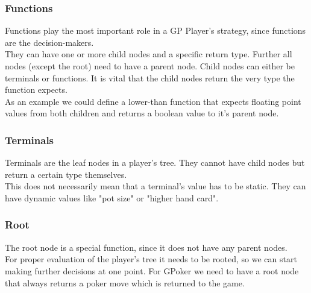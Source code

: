 \documentclass[12pt,fleqn,a4paper]{article}
\begin{document}
\subsubsection{Functions}
Functions play the most important role in a GP Player's strategy, since functions are the decision-makers.\\
They can have one or more child nodes and a specific return type. Further all nodes (except the root)  need to have a parent node.
Child nodes can either be terminals or functions. It is vital that the child nodes return the very type the function expects.\\
As an example we could define a lower-than function that expects floating point values from both children and returns a boolean value to it's parent node.

\subsubsection{Terminals}
Terminals are the leaf nodes in a player's tree. They cannot have child nodes but return a certain type themselves.\\
This does not necessarily mean that a terminal's value has to be static. They can have dynamic values like "pot size" or "higher hand card".

\subsubsection{Root}
The root node is a special function, since it does not have any parent nodes.\\
For proper evaluation of the player's tree it needs to be rooted, so we can start making further decisions at one point.
For GPoker we need to have a root node that always returns a poker move which is returned to the game.\\

\newpage
\end{document}
